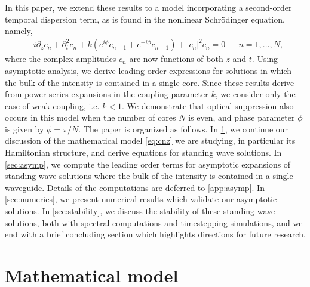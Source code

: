 \documentclass[11pt,reqno]{amsart}
\begin{document}
In this paper, we extend these results to a model incorporating a second-order temporal dispersion term, as is found in the nonlinear Schr\"odinger equation, namely,
\begin{align}\label{eq:cnz}
&i\partial_z c_n + \partial_t^2 c_n + k\left(e^{i\phi}c_{n-1}+e^{-i\phi}c_{n+1}\right)+|c_n|^2 c_n = 0 && n = 1, \dots, N,
\end{align}
where the complex amplitudes $c_n$ are now functions of both $z$ and $t$. Using asymptotic analysis, we derive leading order expressions for solutions in which the bulk of the intensity is contained in a single core. Since these results derive from power series expansions in the coupling parameter $k$, we consider only the case of weak coupling, i.e. $k < 1$.
We demonstrate that optical suppression also occurs in this model when the number of cores $N$ is even, and phase parameter $\phi$ is given by $\phi=\pi/N$. The paper is organized as follows. In \cref{sec:model}, we continue our discussion of the mathematical model \cref{eq:cnz} we are studying, in particular its Hamiltonian structure, and derive equations for standing wave solutions. In \cref{sec:asymp}, we compute the leading order terms for asymptotic expansions of standing wave solutions where the bulk of the intensity is contained in a single waveguide. Details of the computations are deferred to \cref{app:asymp}. In \cref{sec:numerics}, we present numerical results which validate our asymptotic solutions. In \cref{sec:stability}, we discuss the stability of these standing wave solutions, both with spectral computations and timestepping simulations, and we end with a brief concluding section which highlights directions for future research.

\section{Mathematical model}\label{sec:model}
\end{document}
